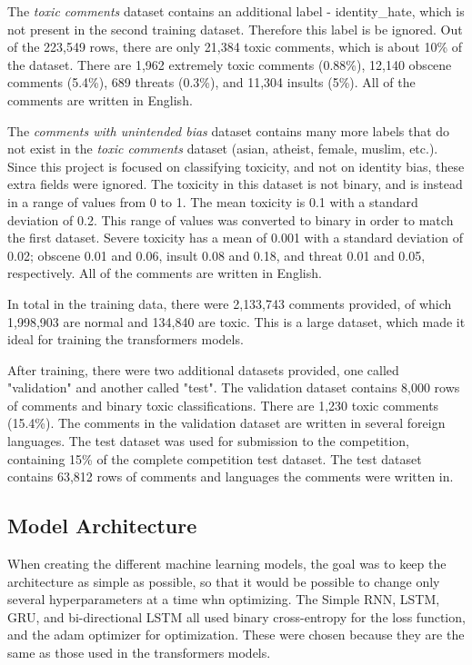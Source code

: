 \documentclass{article}
\begin{document}
The \textit{toxic comments} dataset contains an additional label - identity\_hate, which is not present in the second training dataset. Therefore this label is be ignored. Out of the 223,549 rows, there are only 21,384 toxic comments, which is about 10\% of the dataset. There are 1,962 extremely toxic comments (0.88\%), 12,140 obscene comments (5.4\%), 689 threats (0.3\%), and 11,304 insults (5\%). All of the comments are written in English.

The \textit{comments with unintended bias} dataset contains many more labels that do not exist in the \textit{toxic comments} dataset (asian, atheist, female, muslim, etc.). Since this project is focused on classifying toxicity, and not on identity bias, these extra fields were ignored. The toxicity in this dataset is not binary, and is instead in a range of values from 0 to 1. The mean toxicity is 0.1 with a standard deviation of 0.2. This range of values was converted to binary in order to match the first dataset. Severe toxicity has a mean of 0.001 with a standard deviation of 0.02; obscene 0.01 and 0.06, insult 0.08 and 0.18, and threat 0.01 and 0.05, respectively. All of the comments are written in English.

In total in the training data, there were 2,133,743 comments provided, of which 1,998,903 are normal and 134,840 are toxic. This is a large dataset, which made it ideal for training the transformers models.

After training, there were two additional datasets provided, one called "validation" and another called "test". The validation dataset contains 8,000 rows of comments and binary toxic classifications. There are 1,230 toxic comments (15.4\%). The comments in the validation dataset are written in several foreign languages. The test dataset was used for submission to the competition, containing 15\% of the complete competition test dataset. The test dataset contains 63,812 rows of comments and languages the comments were written in.

\subsection{Model Architecture}

When creating the different machine learning models, the goal was to keep the architecture as simple as possible, so that it would be possible to change only several hyperparameters at a time whn optimizing. The Simple RNN, LSTM, GRU, and bi-directional LSTM all used binary cross-entropy for the loss function, and the adam optimizer for optimization. These were chosen because they are the same as those used in the transformers models. 
\end{document}
